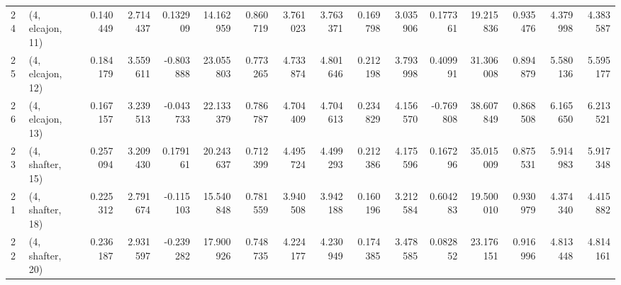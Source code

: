\begin{tabular}{llrrrrrrrrrrrrrr}
24 &  (4, elcajon, 11) &   0.140449 &  2.714437 &  0.132909 &  14.162959 &  0.860719 &   3.761023 &  3.763371 &  0.169798 &  3.035906 &  0.177361 &   19.215836 &  0.935476 &   4.379998 &   4.383587 \\
25 &  (4, elcajon, 12) &   0.184179 &  3.559611 & -0.803888 &  23.055803 &  0.773265 &   4.733874 &  4.801646 &  0.212198 &  3.793998 &  0.409991 &   31.306008 &  0.894879 &   5.580136 &   5.595177 \\
26 &  (4, elcajon, 13) &   0.167157 &  3.239513 & -0.043733 &  22.133379 &  0.786787 &   4.704409 &  4.704613 &  0.234829 &  4.156570 & -0.769808 &   38.607849 &  0.868508 &   6.165650 &   6.213521 \\
23 &  (4, shafter, 15) &   0.257094 &  3.209430 &  0.179161 &  20.243637 &  0.712399 &   4.495724 &  4.499293 &  0.212386 &  4.175596 &  0.167296 &   35.015009 &  0.875531 &   5.914983 &   5.917348 \\
21 &  (4, shafter, 18) &   0.225312 &  2.791674 & -0.115103 &  15.540848 &  0.781559 &   3.940508 &  3.942188 &  0.160196 &  3.212584 &  0.604283 &   19.500010 &  0.930979 &   4.374340 &   4.415882 \\
22 &  (4, shafter, 20) &   0.236187 &  2.931597 & -0.239282 &  17.900926 &  0.748735 &   4.224177 &  4.230949 &  0.174385 &  3.478585 &  0.082852 &   23.176151 &  0.916996 &   4.813448 &   4.814161 \\
\bottomrule
\end{tabular}
